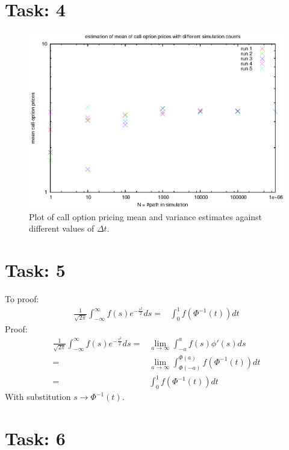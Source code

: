 \documentclass{article}
\begin{document}
\section*{Task: 4}  %
\begin{figure}[htbp]
  \centering
     \includegraphics[width=1.0\textwidth]{../Task04/sh2_task4_plot.eps}
   \caption{Plot of call option pricing mean and variance estimates against different values of $\Delta t$.}
\end{figure}

\section*{Task: 5}

\noindent To proof:
\begin{align*}
 \frac{1}{\sqrt{2 \pi}} \int_{-\infty}^\infty f(s)e^{-\frac{s^2}{2}}ds =& \int_{0}^1 f(\Phi^{-1}(t))dt
\end{align*}
Proof:
\begin{align*}
 \frac{1}{\sqrt{2 \pi}} \int_{-\infty}^\infty f(s)e^{-\frac{s^2}{2}}ds =& \lim_{a\rightarrow \infty}\int_{-a}^a f(s) \phi '(s)ds\\
  =& \lim_{a\rightarrow \infty}\int_{\Phi(-a)}^{\Phi(a)} f(\Phi^{-1}(t)) dt\\
  =& \int_{0}^{1} f(\Phi^{-1}(t)) dt
\end{align*}
With substitution $s\rightarrow \Phi^{-1}(t)$.
{\flushright{$\qed$}}

\section*{Task: 6}
\end{document}
